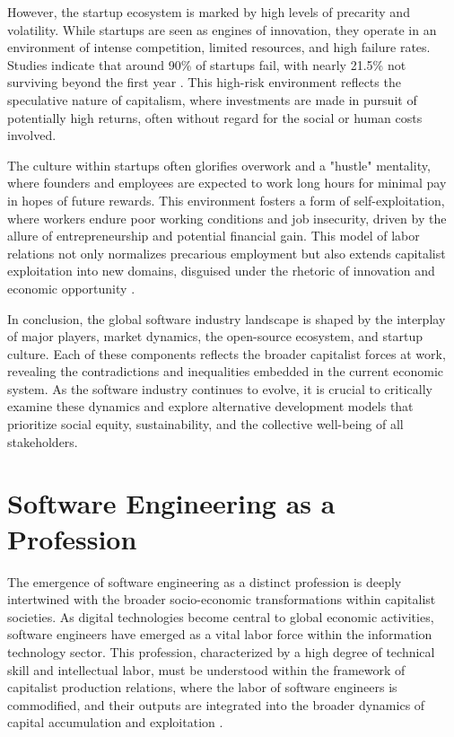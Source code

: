 \begin{refsection}
However, the startup ecosystem is marked by high levels of precarity and volatility. While startups are seen as engines of innovation, they operate in an environment of intense competition, limited resources, and high failure rates. Studies indicate that around 90\% of startups fail, with nearly 21.5\% not surviving beyond the first year \cite[pp.~118-120]{ries2011leanstartup}. This high-risk environment reflects the speculative nature of capitalism, where investments are made in pursuit of potentially high returns, often without regard for the social or human costs involved.

The culture within startups often glorifies overwork and a "hustle" mentality, where founders and employees are expected to work long hours for minimal pay in hopes of future rewards. This environment fosters a form of self-exploitation, where workers endure poor working conditions and job insecurity, driven by the allure of entrepreneurship and potential financial gain. This model of labor relations not only normalizes precarious employment but also extends capitalist exploitation into new domains, disguised under the rhetoric of innovation and economic opportunity \cite[pp.~18-20]{neff2015venturelabor}.

In conclusion, the global software industry landscape is shaped by the interplay of major players, market dynamics, the open-source ecosystem, and startup culture. Each of these components reflects the broader capitalist forces at work, revealing the contradictions and inequalities embedded in the current economic system. As the software industry continues to evolve, it is crucial to critically examine these dynamics and explore alternative development models that prioritize social equity, sustainability, and the collective well-being of all stakeholders.

\section{Software Engineering as a Profession}

The emergence of software engineering as a distinct profession is deeply intertwined with the broader socio-economic transformations within capitalist societies. As digital technologies become central to global economic activities, software engineers have emerged as a vital labor force within the information technology sector. This profession, characterized by a high degree of technical skill and intellectual labor, must be understood within the framework of capitalist production relations, where the labor of software engineers is commodified, and their outputs are integrated into the broader dynamics of capital accumulation and exploitation \cite[pp.~874-876]{marx2008capital}.


\end{refsection}
